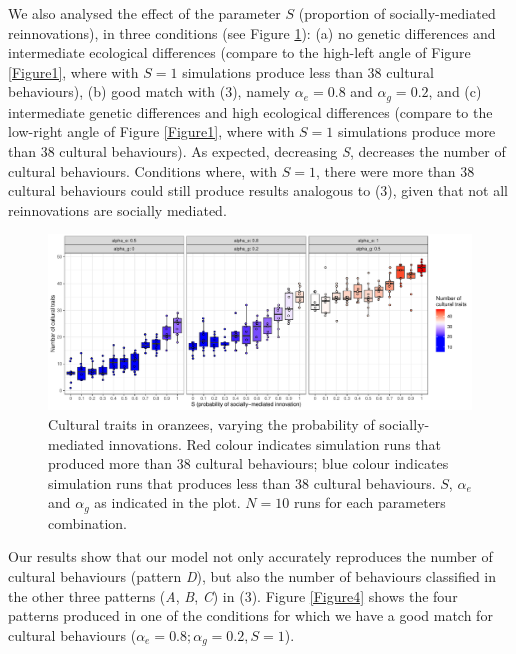 \documentclass[9pt,twocolumn,twoside,]{pnas-new}
\begin{document}
We also analysed the effect of the parameter \(S\) (proportion of
socially-mediated reinnovations), in three conditions (see Figure
\ref{Figure3}): (a) no genetic differences and intermediate ecological
differences (compare to the high-left angle of Figure \ref{Figure1},
where with \(S=1\) simulations produce less than 38 cultural
behaviours), (b) good match with (3), namely \(\alpha_e=0.8\) and
\(\alpha_g=0.2\), and (c) intermediate genetic differences and high
ecological differences (compare to the low-right angle of Figure
\ref{Figure1}, where with \(S=1\) simulations produce more than 38
cultural behaviours). As expected, decreasing \emph{S}, decreases the
number of cultural behaviours. Conditions where, with \(S=1\), there
were more than 38 cultural behaviours could still produce results
analogous to (3), given that not all reinnovations are socially
mediated.

\begin{figure}[h!]
\begin{center}
\includegraphics[width=17.8cm]{figures/figure_3.pdf}
\caption{Cultural traits in oranzees, varying the probability of socially-mediated innovations. Red colour indicates simulation runs that produced more than 38 cultural behaviours; blue colour indicates simulation runs that produces less than 38 cultural behaviours. $S$, $\alpha_e$ and $\alpha_g$ as indicated in the plot. $N=10$ runs for each parameters combination.}
\label{Figure3}
\end{center}
\end{figure}

Our results show that our model not only accurately reproduces the
number of cultural behaviours (pattern \emph{D}), but also the number of
behaviours classified in the other three patterns (\emph{A}, \emph{B},
\emph{C}) in (3). Figure \ref{Figure4} shows the four patterns produced
in one of the conditions for which we have a good match for cultural
behaviours (\(\alpha_e=0.8;\alpha_g=0.2, S=1\)).
\end{document}
